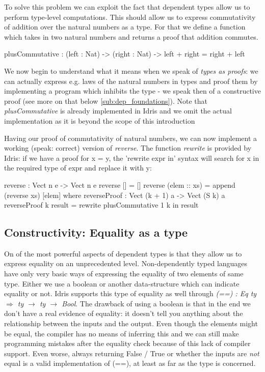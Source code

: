 To solve this problem we can exploit the fact that dependent types allow us to perform type-level computations. This should allow us to express commutativity of addition over the natural numbers as a type. For that we define a function which takes in two natural numbers and returns a proof that addition commutes. 

\begin{HaskellCode}
plusCommutative : (left : Nat) -> (right : Nat) -> left + right = right + left
\end{HaskellCode}

We now begin to understand what it means when we speak of \textit{types as proofs}: we can actually express e.g. laws of the natural numbers in types and proof them by implementing a program which inhibits the type - we speak then of a constructive proof (see more on that below \ref{sub:dep_foundations}). Note that \textit{plusCommutative} is already implemented in Idris and we omit the actual implementation as it is beyond the scope of this introduction

Having our proof of commutativity of natural numbers, we can now implement a working (speak: correct) version of \textit{reverse}. The function \textit{rewrite} is provided by Idris: if we have a proof for x = y, the 'rewrite expr in' syntax will search for x in the required type of expr and replace it with y:

\begin{HaskellCode}
reverse : Vect n e -> Vect n e
reverse [] = []
reverse (elem :: xs) = append (reverse xs) [elem]
  where
    reverseProof : Vect (k + 1) a -> Vect (S k) a
    reverseProof {k} result = rewrite plusCommutative 1 k in result
\end{HaskellCode}

\subsection{Constructivity: Equality as a type}
On of the most powerful aspects of dependent types is that they allow us to express equality on an unprecedented level. Non-dependently typed languages have only very basic ways of expressing the equality of two elements of same type. Either we use a boolean or another data-structure which can indicate equality or not. Idris supports this type of equality as well through \textit{(==) : Eq ty $\Rightarrow$ ty $\rightarrow$ ty $\rightarrow$ Bool}. The drawback of using a boolean is that in the end we don't have a real evidence of equality: it doesn't tell you anything about the relationship between the inputs and the output. Even though the elements might be equal, the compiler has no means of inferring this and we can still make programming mistakes after the equality check because of this lack of compiler support. Even worse, always returning False / True or whether the inputs are \textit{not} equal is a valid implementation of (==), at least as far as the type is concerned.

